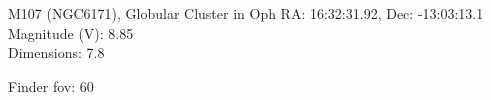 \begin{block}{M107 (NGC6171), Globular Cluster in Oph}
    RA: 16:32:31.92, Dec: -13:03:13.1 \\ 
    Magnitude (V): 8.85 \\ 
    Dimensions: 7.8 

    Finder fov: 60 
\end{block}